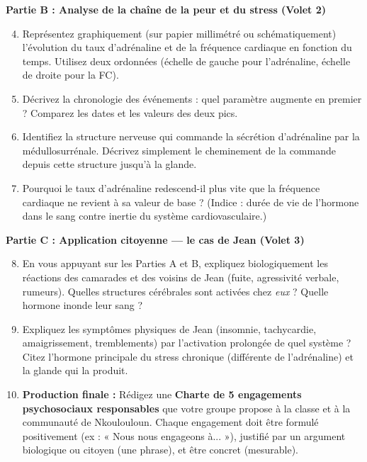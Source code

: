 \documentclass[11pt]{article}
\begin{document}
\textbf{Partie B : Analyse de la chaîne de la peur et du stress (Volet 2)}
\begin{enumerate}
    \setcounter{enumi}{3}
    \item Représentez graphiquement (sur papier millimétré ou schématiquement) l'évolution du taux d'adrénaline et de la fréquence cardiaque en fonction du temps. Utilisez deux ordonnées (échelle de gauche pour l'adrénaline, échelle de droite pour la FC).
    \item Décrivez la chronologie des événements : quel paramètre augmente en premier ? Comparez les dates et les valeurs des deux pics.
    \item Identifiez la structure nerveuse qui commande la sécrétion d'adrénaline par la médullosurrénale. Décrivez simplement le cheminement de la commande depuis cette structure jusqu'à la glande.
    \item Pourquoi le taux d'adrénaline redescend-il plus vite que la fréquence cardiaque ne revient à sa valeur de base ? (Indice : durée de vie de l'hormone dans le sang contre inertie du système cardiovasculaire.)
\end{enumerate}

\textbf{Partie C : Application citoyenne — le cas de Jean (Volet 3)}
\begin{enumerate}
    \setcounter{enumi}{7}
    \item En vous appuyant sur les Parties A et B, expliquez biologiquement les réactions des camarades et des voisins de Jean (fuite, agressivité verbale, rumeurs). Quelles structures cérébrales sont activées chez \emph{eux} ? Quelle hormone inonde leur sang ?
    \item Expliquez les symptômes physiques de Jean (insomnie, tachycardie, amaigrissement, tremblements) par l'activation prolongée de quel système ? Citez l'hormone principale du stress chronique (différente de l'adrénaline) et la glande qui la produit.
    \item \textbf{Production finale :} Rédigez une \textbf{Charte de 5 engagements psychosociaux responsables} que votre groupe propose à la classe et à la communauté de Nkoulouloun. Chaque engagement doit être formulé positivement (ex : « Nous nous engageons à... »), justifié par un argument biologique ou citoyen (une phrase), et être concret (mesurable).
\end{enumerate}
\end{document}
